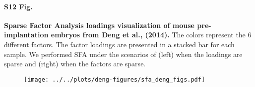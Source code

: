 \documentclass[10pt,letterpaper]{article}
\begin{document}
\paragraph*{S12 Fig.}
\label{figS12}
{\bf Sparse Factor Analysis loadings visualization of mouse pre-implantation embryos from Deng et al., (2014).} The colors represent the 6 different factors. The factor loadings are presented in a stacked bar for each sample. We performed SFA under the scenarios of (left) when the loadings are sparse and (right) when the factors are sparse.
\begin{figure}[ht]
\centering
\texttt{[image: ../../plots/deng-figures/sfa\_deng\_figs.pdf]}
\end{figure}
\end{document}
